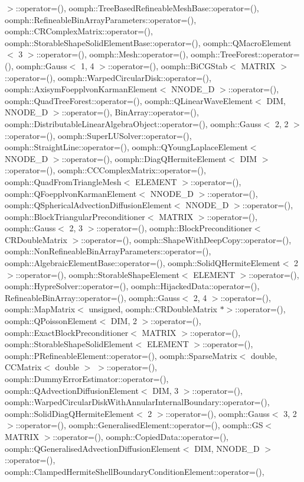 $>$\+::operator=(), oomph\+::\+Tree\+Based\+Refineable\+Mesh\+Base\+::operator=(), oomph\+::\+Refineable\+Bin\+Array\+Parameters\+::operator=(), oomph\+::\+C\+R\+Complex\+Matrix\+::operator=(), oomph\+::\+Storable\+Shape\+Solid\+Element\+Base\+::operator=(), oomph\+::\+Q\+Macro\+Element$<$ 3 $>$\+::operator=(), oomph\+::\+Mesh\+::operator=(), oomph\+::\+Tree\+Forest\+::operator=(), oomph\+::\+Gauss$<$ 1, 4 $>$\+::operator=(), oomph\+::\+Bi\+C\+G\+Stab$<$ M\+A\+T\+R\+I\+X $>$\+::operator=(), oomph\+::\+Warped\+Circular\+Disk\+::operator=(), oomph\+::\+Axisym\+Foepplvon\+Karman\+Element$<$ N\+N\+O\+D\+E\+\_\+D $>$\+::operator=(), oomph\+::\+Quad\+Tree\+Forest\+::operator=(), oomph\+::\+Q\+Linear\+Wave\+Element$<$ D\+I\+M, N\+N\+O\+D\+E\+\_\+D $>$\+::operator=(), Bin\+Array\+::operator=(), oomph\+::\+Distributable\+Linear\+Algebra\+Object\+::operator=(), oomph\+::\+Gauss$<$ 2, 2 $>$\+::operator=(), oomph\+::\+Super\+L\+U\+Solver\+::operator=(), oomph\+::\+Straight\+Line\+::operator=(), oomph\+::\+Q\+Young\+Laplace\+Element$<$ N\+N\+O\+D\+E\+\_\+D $>$\+::operator=(), oomph\+::\+Diag\+Q\+Hermite\+Element$<$ D\+I\+M $>$\+::operator=(), oomph\+::\+C\+C\+Complex\+Matrix\+::operator=(), oomph\+::\+Quad\+From\+Triangle\+Mesh$<$ E\+L\+E\+M\+E\+N\+T $>$\+::operator=(), oomph\+::\+Q\+Foepplvon\+Karman\+Element$<$ N\+N\+O\+D\+E\+\_\+D $>$\+::operator=(), oomph\+::\+Q\+Spherical\+Advection\+Diffusion\+Element$<$ N\+N\+O\+D\+E\+\_\+D $>$\+::operator=(), oomph\+::\+Block\+Triangular\+Preconditioner$<$ M\+A\+T\+R\+I\+X $>$\+::operator=(), oomph\+::\+Gauss$<$ 2, 3 $>$\+::operator=(), oomph\+::\+Block\+Preconditioner$<$ C\+R\+Double\+Matrix $>$\+::operator=(), oomph\+::\+Shape\+With\+Deep\+Copy\+::operator=(), oomph\+::\+Non\+Refineable\+Bin\+Array\+Parameters\+::operator=(), oomph\+::\+Algebraic\+Element\+Base\+::operator=(), oomph\+::\+Solid\+Q\+Hermite\+Element$<$ 2 $>$\+::operator=(), oomph\+::\+Storable\+Shape\+Element$<$ E\+L\+E\+M\+E\+N\+T $>$\+::operator=(), oomph\+::\+Hypre\+Solver\+::operator=(), oomph\+::\+Hijacked\+Data\+::operator=(), Refineable\+Bin\+Array\+::operator=(), oomph\+::\+Gauss$<$ 2, 4 $>$\+::operator=(), oomph\+::\+Map\+Matrix$<$ unsigned, oomph\+::\+C\+R\+Double\+Matrix $\ast$$>$\+::operator=(), oomph\+::\+Q\+Poisson\+Element$<$ D\+I\+M, 2 $>$\+::operator=(), oomph\+::\+Exact\+Block\+Preconditioner$<$ M\+A\+T\+R\+I\+X $>$\+::operator=(), oomph\+::\+Storable\+Shape\+Solid\+Element$<$ E\+L\+E\+M\+E\+N\+T $>$\+::operator=(), oomph\+::\+P\+Refineable\+Element\+::operator=(), oomph\+::\+Sparse\+Matrix$<$ double, C\+C\+Matrix$<$ double $>$ $>$\+::operator=(), oomph\+::\+Dummy\+Error\+Estimator\+::operator=(), oomph\+::\+Q\+Advection\+Diffusion\+Element$<$ D\+I\+M, 3 $>$\+::operator=(), oomph\+::\+Warped\+Circular\+Disk\+With\+Annular\+Internal\+Boundary\+::operator=(), oomph\+::\+Solid\+Diag\+Q\+Hermite\+Element$<$ 2 $>$\+::operator=(), oomph\+::\+Gauss$<$ 3, 2 $>$\+::operator=(), oomph\+::\+Generalised\+Element\+::operator=(), oomph\+::\+G\+S$<$ M\+A\+T\+R\+I\+X $>$\+::operator=(), oomph\+::\+Copied\+Data\+::operator=(), oomph\+::\+Q\+Generalised\+Advection\+Diffusion\+Element$<$ D\+I\+M, N\+N\+O\+D\+E\+\_\+D $>$\+::operator=(), oomph\+::\+Clamped\+Hermite\+Shell\+Boundary\+Condition\+Element\+::operator=(), 